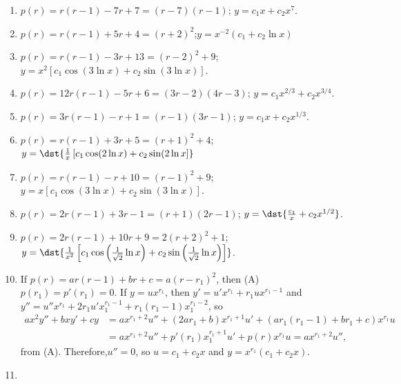 \documentclass[openany]{book}
\newenvironment{sectionSolutions}{
 \begin{enumerate}[item-label={\thesection.\arabic{enumi}.}]
}{
 \end{enumerate}
}
\begin{document}
\begin{sectionSolutions}
\item
$p(r)=r(r-1)-7r+7=(r-7)(r-1)$; $y=c_1x+c_2x^7$.




\item
$p(r)=r(r-1)+5r+4=(r+2)^2$;$y=x^{-2}(c_1+c_2 \ln x)$



\item
$p(r)=r(r-1)-3r+13=(r-2)^2+9$;
 $y=x^2[c_1 \cos (3 \ln x)+c_2 \sin (3 \ln x)]$.



\item
$p(r)=12r(r-1)-5r+6=(3r-2)(4r-3)$;
$y=c_1x^{2/3}+c_2 x^{3/4}$.



\item
$p(r)=3r(r-1)-r+1=(r-1)(3r-1)$; $y=c_1x+c_2x^{1/3}$.




\item
$p(r)=r(r-1)+3r+5=(r+1)^2+4$;
$y=\dst{
 \frac{1}{ x}\left[c_1\cos(2 \ln x)+c_2\sin(2 \ln x\right]}$


\item
$p(r)=r(r-1)-r+10=(r-1)^2+9$;
 $y=x\left[c_1\cos(3 \ln x)+c_2\sin(3 \ln x)\right]$.



\item
$p(r)=2r(r-1)+3r-1=(r+1)(2r-1)$;
$y=\dst{\frac{c_1}{ x}+c_2 x^{1/2}}$.




\item
$p(r)=2r(r-1)+10r+9=2(r+2)^2+1$;
$y=\dst{\frac{1}{ x^2}
\left[c_1\cos\left(\frac{1}{\sqrt{2}} \ln x\right)+c_2\sin
\left(\frac{1}{\sqrt{2}} \ln x\right) \right]}$.


\item
If $p(r)=ar(r-1)+br+c=a(r-r_1)^2$, then (A) $p(r_1)=p'(r_1)=0$.
If $y=ux^{r_1}$, then $y'=u'x^{r_1}+r_1ux^{r_1-1}$
and $y''=u''x^{r_1}+2r_1u'x_1^{r_1-1}+r_1(r_1-1)x_1^{r_1-2}$, so
\begin{align*}
ax^2y''+bxy'+cy&=ax^{r_1+2}u''+(2ar_1+b)x^{r_1+1}u'
+\left(ar_1(r_1-1)+br_1+c\right)x^{r_1}u\\
&=ax^{r_1+2}u''+p'(r_1)x_1^{r_1+1}u'+p(r)x^{r_1}u=ax^{r_1+2}u'',
\end{align*}
from (A). Therefore,$u''=0$, so $u=c_1+c_2x$ and
$y=x^{r_1}(c_1+c_2x)$.


\item
{}
\end{sectionSolutions}
\end{document}
